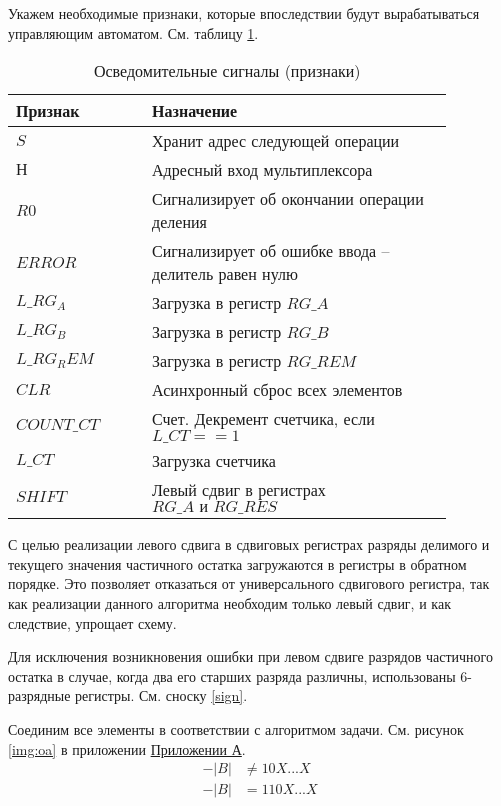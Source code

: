 \documentclass[a4paper,14pt]{extarticle}
\begin{document}
Укажем необходимые признаки, которые впоследствии будут вырабатываться управляющим автоматом. См. таблицу \ref{tab:signals}.
\begin{table}[h!]
	\centering
	\begin{tabular}{|m{0.27\linewidth}|m{0.6\linewidth}|}
		\hline
		\textbf{Признак} & \textbf{Назначение} \\ \hline
		$S$ & Хранит адрес следующей операции \\ \hline
		$Н$ & Адресный вход мультиплексора \\ \hline
		$R0$ & Сигнализирует об окончании операции деления \\ \hline
		$ERROR$ & Сигнализирует об ошибке ввода -- делитель равен нулю \\ \hline
		$L\_RG_A$ & Загрузка в регистр $RG\_A$ \\ \hline
		$L\_RG_B$ & Загрузка в регистр $RG\_B$ \\ \hline
		$L\_RG_REM$ & Загрузка в регистр $RG\_REM$ \\ \hline
		$CLR$ & Асинхронный сброс всех элементов \\ \hline
		$COUNT\_CT$ & Счет. Декремент счетчика, если $L\_CT==1$ \\ \hline
		$L\_CT$ & Загрузка счетчика \\ \hline
		$SHIFT$ & Левый сдвиг в регистрах $RG\_A \text{ и } RG\_RES$ \\ \hline
	\end{tabular}
	\caption{Осведомительные сигналы (признаки)}
	\label{tab:signals}
\end{table}
 С целью реализации левого сдвига в сдвиговых регистрах разряды делимого и текущего значения частичного остатка загружаются в регистры в обратном порядке. Это позволяет отказаться от универсального сдвигового регистра, так как реализации данного алгоритма необходим только левый сдвиг, и как следствие, упрощает схему. 

Для исключения возникновения ошибки при левом сдвиге разрядов частичного остатка в случае, когда два его старших разряда различны, использованы 6-разрядные регистры. См. сноску \ref{sign}.

Соединим все элементы в соответствии с алгоритмом задачи. См. рисунок \ref{img:oa} в приложении \hyperref[tam]{Приложении А}.
\begin{equation}
	\begin{aligned}
	\label{sign}
	-|B| &\neq 10X...X \\
	-|B| &= 110X...X
	\end{aligned}
\end{equation}
\end{document}
